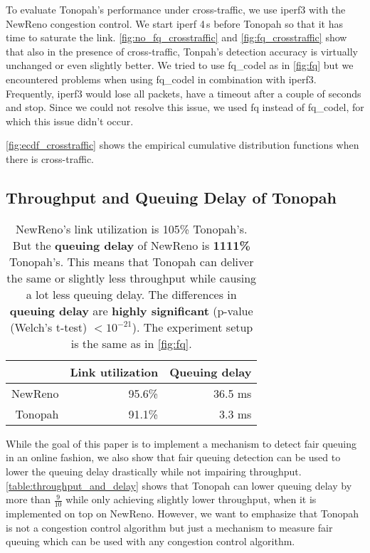 \documentclass[conference]{IEEEtran}
\begin{document}
To evaluate Tonopah's performance under cross-traffic, we use iperf3 with the NewReno congestion control. We start iperf 4\,s before Tonopah so that it has time to saturate the link. 
\autoref{fig:no_fq_crosstraffic} and \autoref{fig:fq_crosstraffic} show that also in the presence of cross-traffic, Tonpah's detection accuracy is virtually unchanged or even slightly better. We tried to use fq\_codel as in \autoref{fig:fq} but we encountered problems when using fq\_codel in combination with iperf3. Frequently, iperf3 would lose all packets, have a timeout after a couple of seconds and stop. Since we could not resolve this issue, we used fq instead of fq\_codel, for which this issue didn't occur. 

\autoref{fig:ecdf_crosstraffic} shows the empirical cumulative distribution functions when there is cross-traffic. 

\subsection{Throughput and Queuing Delay of Tonopah}

\begin{table}[h]
\begin{minipage}{\columnwidth}
\centering
\begin{tabular}{| r | r | r |}
\hline
& Link utilization & Queuing delay \\ \hline
NewReno & 95.6\% & 36.5 ms \\ \hline
Tonopah & 91.1\% & 3.3 ms \\ \hline
\end{tabular}
\caption{NewReno's link utilization is 105\% Tonopah's. 
But the \textbf{queuing delay} of NewReno is \textbf{1111\%} Tonopah's. 
This means that Tonopah can deliver the same or slightly less throughput while causing a lot less queuing delay. 
The differences in \textbf{queuing delay} are \textbf{highly significant} (p-value (Welch's t-test) $< 10^{-21}$). 
The experiment setup is the same as in \autoref{fig:fq}. }
\label{table:throughput_and_delay}
\end{minipage}
\end{table}    

While the goal of this paper is to implement a mechanism to detect fair queuing in an online fashion, 
we also show that fair queuing detection can be used to lower the queuing delay drastically while not impairing throughput. 
\autoref{table:throughput_and_delay} shows that Tonopah can lower queuing delay by more than $\frac{9}{10}$ while only achieving slightly lower throughput, when it is implemented on top on NewReno. 
However, we want to emphasize that Tonopah is not a congestion control algorithm but just a mechanism to measure fair queuing which can be used with any congestion control algorithm. 
\end{document}

